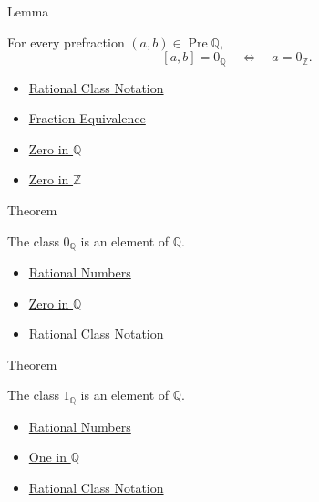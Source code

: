 \begin{lemmabox}{Lemma}
\begin{lemma}
\label{lem:vanishing-criterion-q}
For every prefraction $(a,b)\in\operatorname{Pre}\mathbb{Q}$,
\[
[a,b]=0_{\mathbb{Q}}
\quad\Longleftrightarrow\quad
a=0_{\mathbb{Z}}.
\]
\end{lemma}
\end{lemmabox}

\begin{dependencies}
\begin{itemize}
  \item \hyperref[def:rational-class-notation]{Rational Class Notation}
  \item \hyperref[def:fraction-equivalence]{Fraction Equivalence}
  \item \hyperref[def:zero-in-q]{Zero in $\mathbb{Q}$}
  \item \hyperref[def:zero-in-z]{Zero in $\mathbb{Z}$}
\end{itemize}
\end{dependencies}

\begin{theorembox}{Theorem}
\begin{theorem}
\label{thm:zero-is-a-rational}
The class $0_{\mathbb{Q}}$ is an element of $\mathbb{Q}$.
\end{theorem}
\end{theorembox}

\begin{dependencies}
\begin{itemize}
  \item \hyperref[def:rationals]{Rational Numbers}
  \item \hyperref[def:zero-in-q]{Zero in $\mathbb{Q}$}
  \item \hyperref[def:rational-class-notation]{Rational Class Notation}
\end{itemize}
\end{dependencies}

\begin{theorembox}{Theorem}
\begin{theorem}
\label{thm:one-is-a-rational}
The class $1_{\mathbb{Q}}$ is an element of $\mathbb{Q}$.
\end{theorem}
\end{theorembox}

\begin{dependencies}
\begin{itemize}
  \item \hyperref[def:rationals]{Rational Numbers}
  \item \hyperref[def:one-in-q]{One in $\mathbb{Q}$}
  \item \hyperref[def:rational-class-notation]{Rational Class Notation}
\end{itemize}
\end{dependencies}

